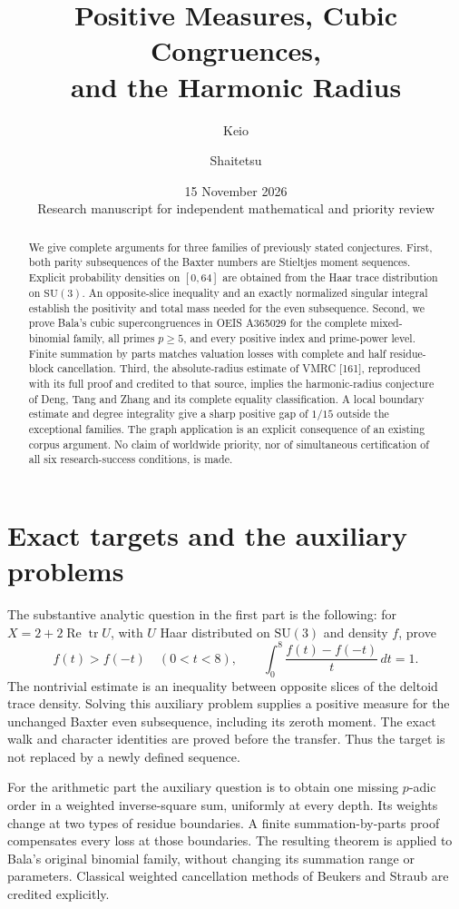 \documentclass[11pt,a4paper]{article}
\title{Positive Measures, Cubic Congruences,\\and the Harmonic Radius}
\author{Keio \and Shaitetsu}
\date{15 November 2026\\\small Research manuscript for independent mathematical and priority review}
\theoremstyle{remark}\newtheorem{remark}[theorem]{Remark}
\numberwithin{equation}{section}
\begin{document}
\maketitle
\begin{abstract}
We give complete arguments for three families of previously stated conjectures.
First, both parity subsequences of the Baxter numbers are Stieltjes moment
sequences. Explicit probability densities on $[0,64]$ are obtained from the
Haar trace distribution on $\mathrm{SU}(3)$. An opposite-slice inequality
and an exactly normalized singular integral establish the positivity and
total mass needed for the even subsequence. Second, we prove Bala's cubic
supercongruences in OEIS A365029 for the complete mixed-binomial family,
all primes $p\ge5$, and every positive index and prime-power level.
Finite summation by parts matches valuation losses with complete and
half residue-block cancellation. Third, the absolute-radius estimate
of VMRC [161], reproduced with its full proof and credited to that source,
implies the harmonic-radius conjecture of Deng, Tang and Zhang and its
complete equality classification. A local boundary estimate and degree
integrality give a sharp positive gap of $1/15$ outside the exceptional
families. The graph application is an explicit
consequence of an existing corpus argument. No claim of worldwide
priority, nor of simultaneous certification of all six research-success
conditions, is made.
\end{abstract}

\section{Exact targets and the auxiliary problems}
The substantive analytic question in the first part is the following:
for $X=2+2\operatorname{Re}\operatorname{tr}U$, with $U$ Haar distributed
on $\mathrm{SU}(3)$ and density $f$, prove
\[
 f(t)>f(-t)\quad(0<t<8),\qquad
 \int_0^8\frac{f(t)-f(-t)}t\,dt=1.
\]
The nontrivial estimate is an inequality between opposite slices of the
deltoid trace density. Solving this auxiliary problem supplies a positive
measure for the unchanged Baxter even subsequence, including its zeroth
moment. The exact walk and character identities are proved before the
transfer. Thus the target is not replaced by a newly defined sequence.

For the arithmetic part the auxiliary question is to obtain one missing
$p$-adic order in a weighted inverse-square sum, uniformly at every depth.
Its weights change at two types of residue boundaries. A finite
summation-by-parts proof compensates every loss at those boundaries.
The resulting theorem is applied to Bala's original binomial family,
without changing its summation range or parameters. Classical weighted
cancellation methods of Beukers and Straub are credited explicitly.
\end{document}

